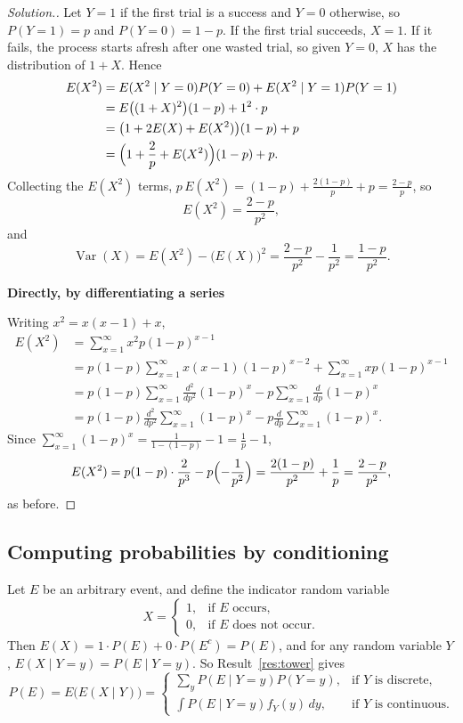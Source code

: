 \documentclass[11pt,a4paper]{article}
\theoremstyle{definition}
\newenvironment{solution}
  {\renewcommand{\qedsymbol}{}\begin{proof}[\textit{Solution}.]}
  {\end{proof}}
\newcommand{\subhead}[1]{%
  \par\medskip\noindent\textbf{#1}\par\nobreak\smallskip}
\DeclareMathOperator{\Var}{Var}
\begin{document}
\begin{solution}
Let $Y = 1$ if the first trial is a success and $Y = 0$ otherwise, so $P(Y = 1) = p$ and $P(Y = 0) = 1 - p$. If the first trial succeeds, $X = 1$.
If it fails, the process starts afresh after one wasted trial, so given $Y = 0$, $X$ has the distribution of $1 + X$. Hence
\begin{align*}
E(X^2) &= E(X^2 \mid Y = 0)P(Y = 0) + E(X^2 \mid Y = 1)P(Y = 1) \\
&= E\bigl((1 + X)^2\bigr)(1 - p) + 1^2 \cdot p \\
&= \bigl(1 + 2E(X) + E(X^2)\bigr)(1 - p) + p \\
&= \Bigl(1 + \frac2p + E(X^2)\Bigr)(1 - p) + p .
\end{align*}
Collecting the $E(X^2)$ terms, $p\,E(X^2) = (1 - p) + \frac{2(1 - p)}{p} + p = \frac{2 - p}{p}$, so
\[
E(X^2) = \frac{2 - p}{p^2} ,
\]
and
\[
\Var(X) = E(X^2) - \bigl(E(X)\bigr)^2 = \frac{2 - p}{p^2} - \frac{1}{p^2} = \frac{1 - p}{p^2} .
\]

\subhead{Directly, by differentiating a series}
Writing $x^2 = x(x - 1) + x$,
\begin{align*}
E(X^2) &= \sum_{x=1}^\infty x^2p(1 - p)^{x-1} \\
&= p(1 - p)\sum_{x=1}^\infty x(x - 1)(1 - p)^{x-2} + \sum_{x=1}^\infty xp(1 - p)^{x-1} \\
&= p(1 - p)\sum_{x=1}^\infty\frac{d^2}{dp^2}(1 - p)^x - p\sum_{x=1}^\infty\frac{d}{dp}(1 - p)^x \\
&= p(1 - p)\frac{d^2}{dp^2}\sum_{x=1}^\infty(1 - p)^x - p\frac{d}{dp}\sum_{x=1}^\infty(1 - p)^x .
\end{align*}
Since $\sum_{x=1}^\infty(1 - p)^x = \frac{1}{1 - (1 - p)} - 1 = \frac1p - 1$,
\[
E(X^2) = p(1 - p)\cdot\frac{2}{p^3} - p\Bigl(-\frac{1}{p^2}\Bigr) = \frac{2(1 - p)}{p^2} + \frac1p = \frac{2 - p}{p^2} ,
\]
as before.
\end{solution}

\subsection{Computing probabilities by conditioning}
Let $E$ be an arbitrary event, and define the indicator random variable
\[
X = \begin{cases} 1 , & \text{if } E \text{ occurs} , \\ 0 , & \text{if } E \text{ does not occur.} \end{cases}
\]
Then $E(X) = 1 \cdot P(E) + 0 \cdot P(E^c) = P(E)$, and for any random variable $Y$, $E(X \mid Y = y) = P(E \mid Y = y)$. So Result~\ref{res:tower} gives
\[
P(E) = E\bigl(E(X \mid Y)\bigr) = \begin{cases} \displaystyle\sum_yP(E \mid Y = y)P(Y = y) , & \text{if } Y \text{ is discrete} , \\[2ex] \displaystyle\int P(E \mid Y = y)f_Y(y)\,dy , & \text{if } Y \text{ is continuous.} \end{cases}
\]
\end{document}
